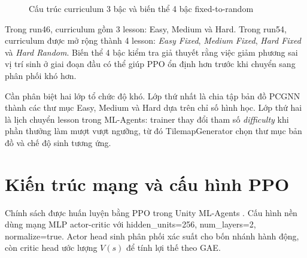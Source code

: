 \begin{figure}[H]
    \centering
    \caption{Cấu trúc curriculum 3 bậc và biến thể 4 bậc fixed-to-random}
    \label{fig:curriculum_structure}
\end{figure}

Trong run46, curriculum gồm 3 lesson: Easy, Medium và Hard. Trong run54, curriculum được mở rộng thành 4 lesson: \emph{Easy Fixed}, \emph{Medium Fixed}, \emph{Hard Fixed} và \emph{Hard Random}. Biến thể 4 bậc kiểm tra giả thuyết rằng việc giảm phương sai vị trí sinh ở giai đoạn đầu có thể giúp PPO ổn định hơn trước khi chuyển sang phân phối khó hơn.

Cần phân biệt hai lớp tổ chức độ khó. Lớp thứ nhất là chia tập bản đồ PCGNN thành các thư mục Easy, Medium và Hard dựa trên chỉ số hình học. Lớp thứ hai là lịch chuyển lesson trong ML-Agents: trainer thay đổi tham số \emph{difficulty} khi phần thưởng làm mượt vượt ngưỡng, từ đó TilemapGenerator chọn thư mục bản đồ và chế độ sinh tương ứng.

\section{Kiến trúc mạng và cấu hình PPO}

Chính sách được huấn luyện bằng PPO trong Unity ML-Agents \cite{Juliani2018}. Cấu hình nền dùng mạng MLP actor-critic với hidden\_units=256, num\_layers=2, normalize=true. Actor head sinh phân phối xác suất cho bốn nhánh hành động, còn critic head ước lượng $V(s)$ để tính lợi thế theo GAE.

